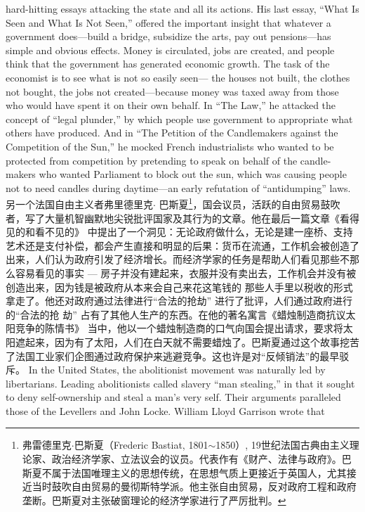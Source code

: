 \begin{paracol}{2}
hard-hitting essays attacking the state and all its actions. His
last essay, ``What Is Seen and What Is Not Seen,'' offered the
important insight that whatever a government does---build a
bridge, subsidize the arts, pay out pensions---has simple and
obvious effects. Money is circulated, jobs are created, and people think that the government has generated economic growth.
The task of the economist is to see what is not so easily seen---
the houses not built, the clothes not bought, the jobs not created---because money was taxed away from those who would
have spent it on their own behalf. In ``The Law,'' he attacked the
concept of ``legal plunder,'' by which people use government to
appropriate what others have produced. And in ``The Petition of
the Candlemakers against the Competition of the Sun,'' he
mocked French industrialists who wanted to be protected from
competition by pretending to speak on behalf of the candle-makers who wanted Parliament to block out the sun, which was
causing people not to need candles during daytime---an early
refutation of ``antidumping'' laws.
\switchcolumn
另一个法国自由主义者弗里德里克$\cdot$ 巴斯夏\footnote{弗雷德里克$\cdot$巴斯夏（Frederic Bastiat, 1801$\sim$1850）, 19世纪法国古典由主义理论家、政治经济学家、立法议会的议员。代表作有《财产、法律与政府》。巴斯夏不属于法国唯理主义的思想传统，在思想气质上更接近于英国人，尤其接近当时鼓吹自由贸易的曼彻斯特学派。他主张自由贸易，反对政府工程和政府垄断。巴斯夏对主张破窗理论的经济学家进行了严厉批判。}，国会议员，活跃的自由贸易鼓吹者，写了大量机智幽默地尖锐批评国家及其行为的文章。他在最后一篇文章《看得见的和看不见的》 中提出了一个洞见：无论政府做什么，无论是建一座桥、支持艺术还是支付补偿，都会产生直接和明显的后果：货币在流通，工作机会被创造了出来，人们认为政府引发了经济增长。而经济学家的任务是帮助人们看见那些不那么容易看见的事实 --- 房子并没有建起来，衣服并没有卖出去，工作机会并没有被创造出来，因为钱是被政府从本来会自己来花这笔钱的
那些人手里以税收的形式拿走了。他还对政府通过法律进行“合法的抢劫” 进行了批评，人们通过政府进行的“合法的抢
劫” 占有了其他人生产的东西。在他的著名寓言《蜡烛制造商抗议太阳竞争的陈情书》 当中，他以一个蜡烛制造商的口气向国会提出请求，要求将太阳遮起来，因为有了太阳，人们在白天就不需要蜡烛了。巴斯夏通过这个故事挖苦了法国工业家们企图通过政府保护来逃避竞争。这也许是对“反倾销法”的最早驳斥。
\switchcolumn*
In the United States, the abolitionist movement was naturally led by libertarians. Leading abolitionists called slavery
``man stealing,'' in that it sought to deny self-ownership and
steal a man's very self. Their arguments paralleled those of the
Levellers and John Locke. William Lloyd Garrison wrote that

\end{paracol}
